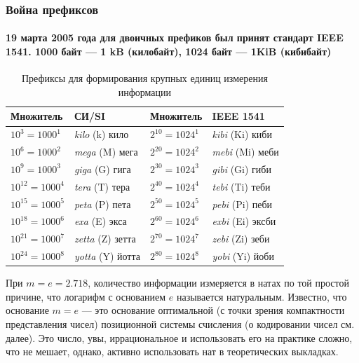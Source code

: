 \begin{frame}
\frametitle{Война префиксов}
\framesubtitle{19 марта 2005 года для двоичных префиков был принят стандарт IEEE 1541. 1000 байт --- 1 kB (килобайт), 1024 байт --- 1KiB (кибибайт)}
\begin{table}[ht]
\caption{Префиксы для формирования крупных единиц измерения информации}\label{t:prefixIEEE1541}
\centering
\begin{tabular}[c]{|l|l||l|l|}
\hline\hline
Множитель          & СИ/SI                  & Множитель        & IEEE 1541 \\
\hline\hline
$10^3  = 1000^1$   & \emph{kilo} (k) кило   & $2^{10} =1024^1$ & \emph{kibi} (Ki) киби\\ \hline
$10^6  = 1000^2$   & \emph{mega} (M) мега   & $2^{20} =1024^2$ & \emph{mebi} (Mi) меби \\ \hline
$10^9  = 1000^3$   & \emph{giga} (G) гига   & $2^{30} =1024^3$ & \emph{gibi} (Gi) гиби\\ \hline
$10^{12} = 1000^4$ & \emph{tera} (T) тера   & $2^{40} =1024^4$ & \emph{tebi} (Ti) теби\\ \hline
$10^{15} = 1000^5$ & \emph{peta} (P) пета   & $2^{50} =1024^5$ & \emph{pebi} (Pi) пеби\\ \hline
$10^{18} = 1000^6$ & \emph{exa} (E) экса    & $2^{60} =1024^6$ & \emph{exbi} (Ei) эксби\\ \hline
$10^{21} = 1000^7$ & \emph{zetta} (Z) зетта & $2^{70} =1024^7$ & \emph{zebi} (Zi) зеби\\ \hline
$10^{24} = 1000^8$ & \emph{yotta} (Y) йотта & $2^{80} =1024^8$ & \emph{yobi} (Yi) йоби\\ \hline
\end{tabular}
\end{table}
\end{frame}

При $m=e=2.718$, количество информации измеряется в натах по той простой причине, что логарифм с основанием $e$ называется натуральным. Известно, что основание $m=e$ --- это основание оптимальной (с точки зрения компактности представления чисел) позиционной системы счисления (о кодировании чисел см. далее). Это число, увы, иррациональное и использовать его на практике сложно, что не мешает, однако, активно использовать нат в теоретических выкладках.

